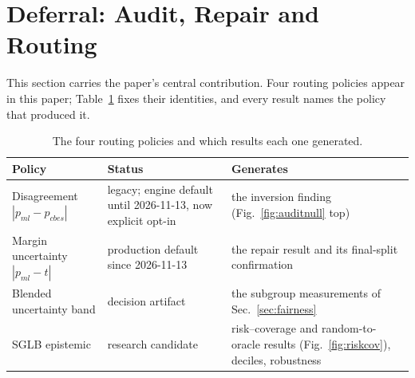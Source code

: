 \documentclass[conference]{IEEEtran}
\begin{document}
\section{Deferral: Audit, Repair and Routing}\label{sec:deferral}
This section carries the paper's central contribution. Four routing
policies appear in this paper; Table~\ref{tab:policies} fixes their
identities, and every result names the policy that produced it.

\begin{table}[t]
\centering
\caption{The four routing policies and which results each one generated.}
\label{tab:policies}
\begin{tabular}{@{}p{2.15cm} p{1.6cm} p{3.5cm}@{}}
\toprule
\textbf{Policy} & \textbf{Status} & \textbf{Generates} \\
\midrule
Disagreement $|p_{ml}{-}p_{cbes}|$ & legacy; engine default until
2026-11-13, now explicit opt-in & the inversion finding
(Fig.~\ref{fig:auditnull} top) \\
Margin uncertainty $|p_{ml}{-}t|$ & production default since 2026-11-13 &
the repair result and its final-split confirmation \\
Blended uncertainty band & decision artifact & the subgroup measurements of
Sec.~\ref{sec:fairness} \\
SGLB epistemic & research candidate & risk--coverage and random-to-oracle
results (Fig.~\ref{fig:riskcov}), deciles, robustness \\
\bottomrule
\end{tabular}
\end{table}
\end{document}
